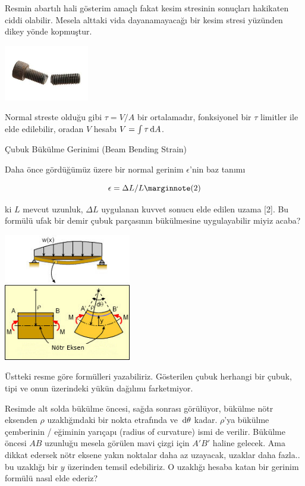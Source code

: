 \documentclass[12pt,fleqn]{article}\usepackage{../../common}
\begin{document}
Resmin abartılı hali gösterim amaçlı fakat kesim stresinin sonuçları hakikaten
ciddi olabilir. Mesela alttaki vida dayanamayacağı bir kesim stresi yüzünden
dikey yönde kopmuştur.

\includegraphics[width=10em]{phy_020_strs_01_04.jpg}

Normal streste olduğu gibi $\tau = V / A$ bir ortalamadır, fonksiyonel bir
$\tau$ limitler ile elde edilebilir, oradan $V$ hesabı $V = \int \tau \,\mathrm{d} A$. 


Çubuk Bükülme Gerinimi (Beam Bending Strain)

Daha önce gördüğümüz üzere bir normal gerinim $\epsilon$'nin baz tanımı

$$
\epsilon = \Delta L / L
\mlabel{2}
$$

ki $L$ mevcut uzunluk, $\Delta L$ uygulanan kuvvet sonucu elde edilen uzama [2].
Bu formülü ufak bir demir çubuk parçasının bükülmesine uygulayabilir miyiz
acaba? 

\includegraphics[width=15em]{phy_020_strs_00_03.jpg}

Üstteki resme göre formülleri yazabiliriz. Gösterilen çubuk herhangi bir
çubuk, tipi ve onun üzerindeki yükün dağılımı farketmiyor.

Resimde alt solda bükülme öncesi, sağda sonrası görülüyor, bükülme nötr eksenden
$\rho$ uzaklığındaki bir nokta etrafında ve $\,\mathrm{d}\theta$ kadar. $\rho$'ya bükülme
çemberinin / eğiminin yarıçapı (radius of curvature) ismi de verilir. Bükülme
öncesi $AB$ uzunluğu mesela görülen mavi çizgi için $A'B'$ haline gelecek. Ama
dikkat edersek nötr eksene yakın noktalar daha az uzayacak, uzaklar daha
fazla.. bu uzaklığı bir $y$ üzerinden temsil edebiliriz. O uzaklığı hesaba katan
bir gerinim formülü nasıl elde ederiz?
\end{document}
